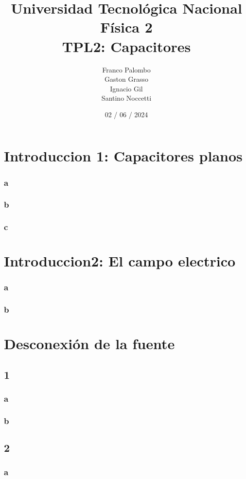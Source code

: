 \documentclass[12pt]{report}
\title{%
  \fontsize{25}{0}\selectfont Universidad Tecnológica Nacional \\
  \fontsize{22}{30}\selectfont Física 2 \\
  \fontsize{18}{25}\selectfont TPL2: Capacitores
}
\author{
Franco Palombo\\
Gaston Grasso\\
Ignacio Gil\\
Santino Noccetti\\
}
\date{02 / 06 / 2024}
\begin{document}
\maketitle

\chapter{Introduccion 1: Capacitores planos}
\subsection{a}
\subsection{b}
\subsection{c}

\chapter{Introduccion2: El campo electrico}
\subsection{a}
\subsection{b}

\chapter{Desconexión de la fuente}
\section{1}
\subsection{a}
\subsection{b}
\section{2}
\subsection{a}
\end{document}
